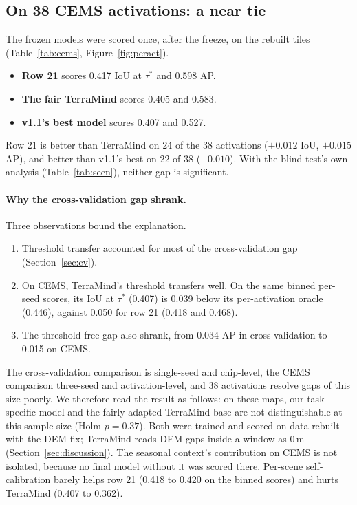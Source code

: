 \documentclass[10pt,twocolumn,a4paper]{article}
\begin{document}
\subsection{On 38 CEMS activations: a near tie}\label{sec:cems}
The frozen models were scored once, after the freeze, on the rebuilt tiles (Table~\ref{tab:cems},
Figure~\ref{fig:peract}).
\begin{itemize}
  \item \textbf{Row 21} scores 0.417 IoU at $\tau^{*}$ and 0.598 AP.
  \item \textbf{The fair TerraMind} scores 0.405 and 0.583.
  \item \textbf{v1.1's best model} scores 0.407 and 0.527.
\end{itemize}
Row 21 is better than TerraMind on 24 of the 38 activations ($+0.012$ IoU, $+0.015$ AP), and better than v1.1's best
on 22 of 38 ($+0.010$). With the blind test's own analysis (Table~\ref{tab:seen}), neither gap is significant.

\paragraph{Why the cross-validation gap shrank.} Three observations bound the explanation.
\begin{enumerate}[label=(\roman*)]
  \item Threshold transfer accounted for most of the cross-validation gap (Section~\ref{sec:cv}).
  \item On CEMS, TerraMind's threshold transfers well. On the same binned per-seed scores, its IoU at $\tau^{*}$
    (0.407) is 0.039 below its per-activation oracle (0.446), against 0.050 for row 21 (0.418 and 0.468).
  \item The threshold-free gap also shrank, from 0.034 AP in cross-validation to 0.015 on CEMS.
\end{enumerate}
The cross-validation comparison is single-seed and chip-level, the CEMS comparison three-seed and activation-level,
and 38 activations resolve gaps of this size poorly. We therefore read the result as follows: on these maps, our
task-specific model and the fairly adapted TerraMind-base are not distinguishable at this sample size (Holm $p=0.37$).
Both were trained and scored on data rebuilt with the DEM fix; TerraMind reads DEM gaps inside a window as 0\,m
(Section~\ref{sec:discussion}). The seasonal context's contribution on CEMS is not isolated, because no final model
without it was scored there. Per-scene self-calibration barely helps row 21 (0.418 to 0.420 on the binned scores)
and hurts TerraMind (0.407 to 0.362).
\end{document}
